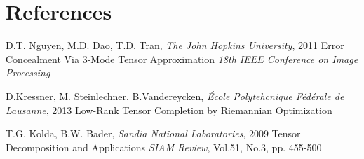 \documentclass{beamer}
\begin{document}
\section*{References}
\begin{frame}


\footnotesize{
\begin{thebibliography}{99} %
\bibitem[ALS]{} D.T. Nguyen, M.D. Dao, T.D. Tran, \textit{The John Hopkins University}, 2011
\newblock Error Concealment Via 3-Mode Tensor Approximation
\newblock \emph{18th IEEE Conference on Image Processing}

\bibitem[GeomCG]{} D.Kressner, M. Steinlechner, B.Vandereycken, \textit{\'Ecole Polytehcnique F\'ed\'erale de Lausanne}, 2013
\newblock Low-Rank Tensor Completion by Riemannian Optimization

 T.G. Kolda, B.W. Bader, \textit{Sandia National Laboratories}, 2009
\newblock Tensor Decomposition and Applications
\newblock \emph{SIAM Review}, Vol.51, No.3, pp. 455-500
\end{thebibliography}
}
\end{frame}
\end{document}
